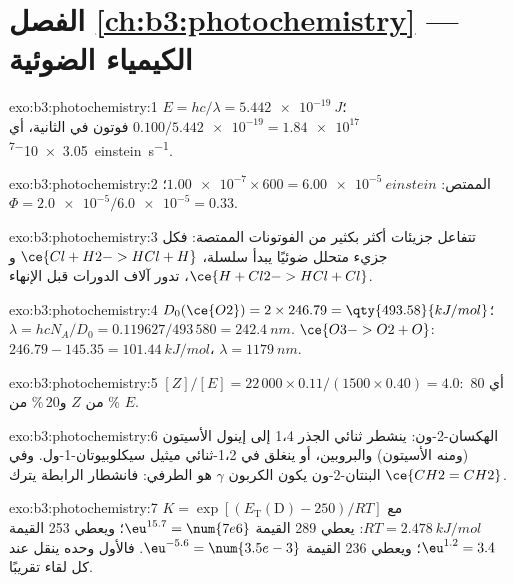 \section*{الفصل \ref{ch:b3:photochemistry} --- الكيمياء الضوئية}

\begin{solution}{exo:b3:photochemistry:1}
$E = hc/\lambda = \qty{5.442e-19}{J}$؛ $0.100/\num{5.442e-19} = \num{1.84e17}$ فوتون في الثانية، أي
\qty{3.05e-7}{einstein.s^{-1}}.
\end{solution}

\begin{solution}{exo:b3:photochemistry:2}
الممتص: $\num{1.00e-7} \times 600 = \qty{6.00e-5}{einstein}$؛ $\Phi = \num{2.0e-5}/\num{6.0e-5} = 0.33$.
\end{solution}

\begin{solution}{exo:b3:photochemistry:3}
تتفاعل جزيئات أكثر بكثير من الفوتونات الممتصة: فكل جزيء  متحلل ضوئيًا يبدأ
سلسلة، $\ce{Cl + H2 -> HCl + H}$ و$\ce{H + Cl2 -> HCl + Cl}$، تدور آلاف الدورات قبل
الإنهاء.
\end{solution}

\begin{solution}{exo:b3:photochemistry:4}
$D_0(\ce{O2}) = 2 \times 246.79 = \qty{493.58}{kJ/mol}$؛ $\lambda = hcN_A/D_0 = 0.119627/493\,580 =
\qty{242.4}{nm}$. $\ce{O3 -> O2 + O}$: $246.79 - 145.35 = \qty{101.44}{kJ/mol}$، $\lambda = \qty{1179}{nm}$.
\end{solution}

\begin{solution}{exo:b3:photochemistry:5}
$[Z]/[E] = 22\,000 \times 0.11/(1500 \times 0.40) = 4.0$: أي 80\,\% من $Z$ و20\,\% من $E$.
\end{solution}

\begin{solution}{exo:b3:photochemistry:6}
الهكسان-2-ون: ينشطر ثنائي الجذر 1،4 إلى إينول الأسيتون (ومنه الأسيتون) 
والبروبين، أو ينغلق في 1،2-ثنائي ميثيل سيكلوبيوتان-1-ول. وفي البنتان-2-ون يكون الكربون $\gamma$
هو  الطرفي: فانشطار الرابطة \babelsublr{$\alpha$--$\beta$} يترك $\ce{CH2=CH2}$.
\end{solution}

\begin{solution}{exo:b3:photochemistry:7}
$K = \exp[(E_{\mathrm T}(\mathrm D) - 250)/RT]$ مع $RT = \qty{2.478}{kJ/mol}$: يعطي 289 القيمة $\eu^{15.7} = \num{7e6}$؛
ويعطي 253 القيمة $\eu^{1.2} = 3.4$؛ ويعطي 236 القيمة $\eu^{-5.6} = \num{3.5e-3}$. فالأول وحده ينقل عند كل
لقاء تقريبًا.
\end{solution}

